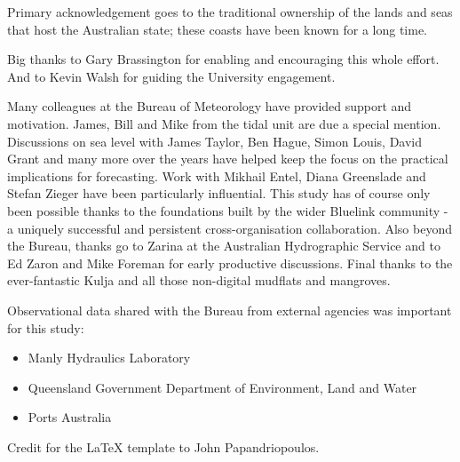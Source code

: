 
\begin{acknowledgements}

{\parindent0pt

Primary acknowledgement goes to the traditional ownership of the lands and seas that host the Australian state; these coasts have been known for a long time.
\newline{}
    
Big thanks to Gary Brassington for enabling and encouraging this whole effort.
And to Kevin Walsh for guiding the University engagement. 

\newline{}
Many colleagues at the Bureau of Meteorology have provided support and motivation. 
James, Bill and Mike from the tidal unit are due a special mention.    
Discussions on sea level with James Taylor, Ben Hague, Simon Louis, David Grant and many more over the years have helped keep the focus on the practical implications for forecasting.
Work with Mikhail Entel, Diana Greenslade and Stefan Zieger have been particularly influential.
\newline{}
This study has of course only been possible thanks to the foundations built by the wider Bluelink community - a uniquely successful and persistent cross-organisation collaboration.
Also beyond the Bureau, thanks go to Zarina at the Australian Hydrographic Service and to Ed Zaron and Mike Foreman for early productive discussions. 
\newline{}
Final thanks to the ever-fantastic Kulja and all those non-digital mudflats and mangroves.  
\newline{}

Observational data shared with the Bureau from external agencies was important for this study:
\begin{itemize}
    \item Manly Hydraulics Laboratory %
    \item Queensland Government Department of Environment, Land and Water
    \item Ports Australia
\end{itemize}


Credit for the LaTeX template to John Papandriopoulos.  %

}   %
\end{acknowledgements}
